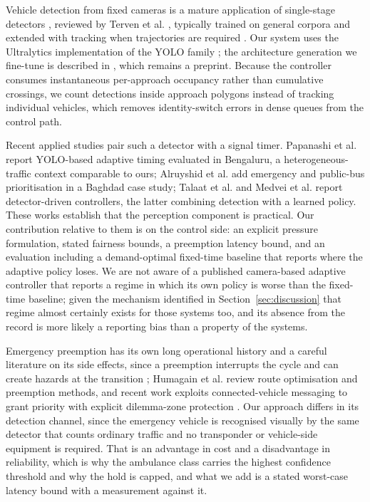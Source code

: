 \documentclass[journal]{IEEEtran}
\begin{document}
Vehicle detection from fixed cameras is a mature application of single-stage detectors
\cite{redmon2016yolo,bochkovskiy2020yolov4}, reviewed by Terven et al.
\cite{terven2023comprehensive}, typically trained on general corpora \cite{lin2014microsoft} and
extended with tracking when trajectories are required \cite{bewley2016simple,wojke2017simple}. Our
system uses the Ultralytics implementation of the YOLO family \cite{jocher2023yolov8}; the architecture
generation we fine-tune is described in \cite{khanam2024yolov11}, which remains a preprint. Because the
controller consumes instantaneous per-approach occupancy rather than cumulative crossings, we count
detections inside approach polygons instead of tracking individual vehicles, which removes
identity-switch errors in dense queues from the control path.

Recent applied studies pair such a detector with a signal timer. Papanashi et al.
\cite{papanashi2024adaptive} report YOLO-based adaptive timing evaluated in Bengaluru, a
heterogeneous-traffic context comparable to ours; Alruyshid et al. \cite{alruyshid2025aibased} add
emergency and public-bus prioritisation in a Baghdad case study; Talaat et al. \cite{talaat2025smart}
and Medvei et al. \cite{medvei2025deepsignal} report detector-driven controllers, the latter combining
detection with a learned policy. These works establish that the perception component is practical. Our
contribution relative to them is on the control side: an explicit pressure formulation, stated fairness
bounds, a preemption latency bound, and an evaluation including a demand-optimal fixed-time baseline
that reports where the adaptive policy loses. We are not aware of a published camera-based adaptive
controller that reports a regime in which its own policy is worse than the fixed-time baseline; given
the mechanism identified in Section~\ref{sec:discussion} that regime almost certainly exists for those
systems too, and its absence from the record is more likely a reporting bias than a property of the
systems.

Emergency preemption has its own long operational history and a careful literature on its side effects,
since a preemption interrupts the cycle and can create hazards at the transition
\cite{louisell2004simple}; Humagain et al. \cite{humagain2020systematic} review route optimisation and
preemption methods, and recent work exploits connected-vehicle messaging to grant priority with explicit
dilemma-zone protection \cite{das2022traffic}. Our approach differs in its detection channel, since the
emergency vehicle is recognised visually by the same detector that counts ordinary traffic and no
transponder or vehicle-side equipment is required. That is an advantage in cost and a disadvantage in
reliability, which is why the ambulance class carries the highest confidence threshold and why the hold
is capped, and what we add is a stated worst-case latency bound with a measurement against it.
\end{document}
